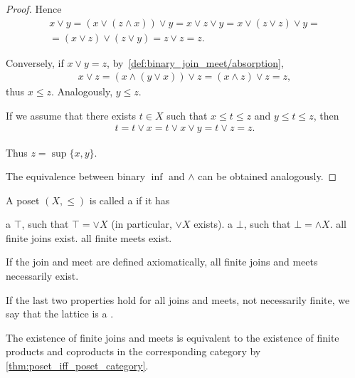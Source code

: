 \begin{proof}
  Hence
  \begin{align*}
    x \lor y = (x \lor (z \land x)) \lor y = x \lor z \lor y = x \lor (z \lor z) \lor y = \\ = (x \lor z) \lor (z \lor y) = z \lor z = z.
  \end{align*}

  Conversely, if \( x \lor y = z \), by~\ref{def:binary_join_meet/absorption},
  \begin{align*}
    x \lor z = (x \land (y \lor x)) \lor z = (x \land z) \lor z = z,
  \end{align*}
  thus \( x \leq z \). Analogously, \( y \leq z \).

  If we assume that there exists \( t \in X \) such that \( x \leq t \leq z \) and \( y \leq t \leq z \), then
  \begin{align*}
    t = t \lor x = t \lor x \lor y = t \lor z = z.
  \end{align*}

  Thus \( z = \sup \{ x, y \} \).

  The equivalence between binary \( \inf \) and \( \land \) can be obtained analogously.
\end{proof}

\begin{definition}\label{def:lattice}
  A poset \( (X, \leq) \) is called a  if it has
  \begin{description}
     a  \( \top \), such that \( \top = \lor X \) (in particular, \( \lor X \) exists).
     a  \( \bot \), such that \( \bot = \land X \).
     all finite joins exist.
     all finite meets exist.
  \end{description}

  If the join and meet are defined axiomatically, all finite joins and meets necessarily exist.

  If the last two properties hold for all joins and meets, not necessarily finite, we say that the lattice is a .
\end{definition}

\begin{note}\label{def:lattice_categorical_product}
  The existence of finite joins and meets is equivalent to the existence of finite products and coproducts in the corresponding category by \cref{thm:poset_iff_poset_category}.
\end{note}

